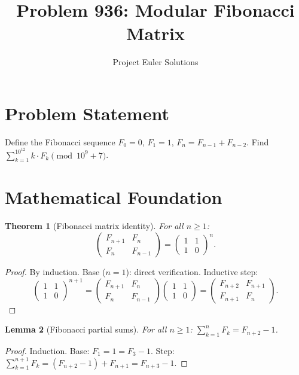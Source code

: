 \documentclass[11pt]{article}
\title{Problem 936: Modular Fibonacci Matrix}
\author{Project Euler Solutions}
\date{}
\newtheorem{theorem}{Theorem}
\newtheorem{lemma}[theorem]{Lemma}
\theoremstyle{definition}
\begin{document}
\maketitle

\section{Problem Statement}

Define the Fibonacci sequence $F_0 = 0$, $F_1 = 1$, $F_n = F_{n-1} + F_{n-2}$. Find $\sum_{k=1}^{10^{12}} k \cdot F_k \pmod{10^9 + 7}$.

\section{Mathematical Foundation}

\begin{theorem}[Fibonacci matrix identity]
For all $n \geq 1$:
\[
\begin{pmatrix} F_{n+1} & F_n \\ F_n & F_{n-1} \end{pmatrix} = \begin{pmatrix} 1 & 1 \\ 1 & 0 \end{pmatrix}^n.
\]
\end{theorem}

\begin{proof}
By induction. Base ($n=1$): direct verification. Inductive step:
\[
\begin{pmatrix} 1 & 1 \\ 1 & 0 \end{pmatrix}^{n+1} = \begin{pmatrix} F_{n+1} & F_n \\ F_n & F_{n-1} \end{pmatrix} \begin{pmatrix} 1 & 1 \\ 1 & 0 \end{pmatrix} = \begin{pmatrix} F_{n+2} & F_{n+1} \\ F_{n+1} & F_n \end{pmatrix}.
\]
\end{proof}

\begin{lemma}[Fibonacci partial sums]
For all $n \geq 1$: $\sum_{k=1}^{n} F_k = F_{n+2} - 1$.
\end{lemma}

\begin{proof}
Induction. Base: $F_1 = 1 = F_3 - 1$. Step: $\sum_{k=1}^{n+1} F_k = (F_{n+2} - 1) + F_{n+1} = F_{n+3} - 1$.
\end{proof}
\end{document}
